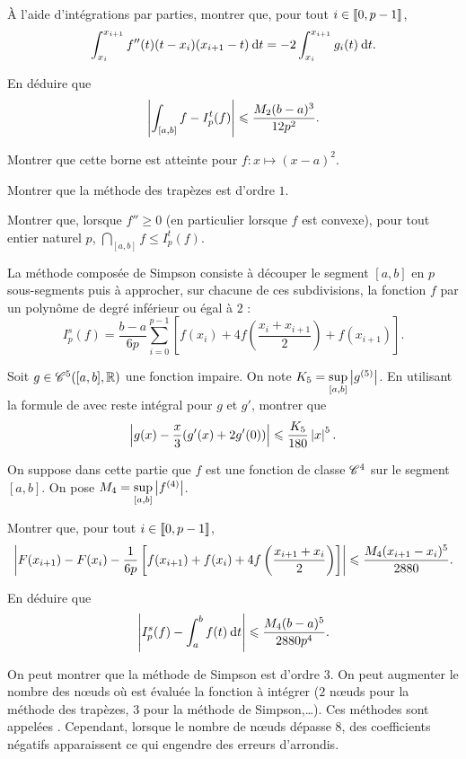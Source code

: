 \documentclass[oneside,11pt]{book}
\begin{document}
\begin{refsection}
\begin{probleme*}
\qu À l'aide d'intégrations par parties, montrer que, pour tout $i \in \llbracket0,p-1\rrbracket$,
\[
\displaystyle \int_{x_i}^{x_{i+1}} f''(t) (t - x_i) (x_{i+1} - t) \:{\text d}t = - 2 \displaystyle \int_{x_i}^{x_{i+1}} g_i(t) \:{\text d}t.
\]

\qu En déduire que
\[
\left\lvert\int_{[a,b]} f - I_p^t(f)\right\rvert \leqslant \frac{M_2 (b-a)^3}{12 p^2}.
\]

\qu Montrer que cette borne est atteinte pour $f : x \mapsto (x - a)^2$.

\qu Montrer que la méthode des trapèzes est d'ordre $1$.

\qu Montrer que, lorsque $f'' \geq 0$ (en particulier lorsque $f$ est convexe), pour tout entier naturel $p$, $\dint_{[a,b]} f \leq I_p^t(f)$.

\sautdepage


La méthode composée de Simpson consiste à découper le segment $[a, b]$ en $p$ sous-segments puis à approcher, sur chacune de ces subdivisions, la fonction $f$ par un polynôme de degré inférieur ou égal à $2$ :
\[
I_p^s(f) = \frac{b-a}{6 p} \sum_{i=0}^{p-1} \left[f(x_i)+ 4 f\left(\frac{x_i + x_{i+1}}{2}\right) + f(x_{i+1})\right].
\]

\qu Soit $g \in \mathscr{C}^5([a, b], \mathbb{R})$ une fonction impaire. On note $K_5 = \sup\limits_{[a,b]} \left\lvert g^{(5)}\right\rvert$. En utilisant la formule de \cite{Taylor} avec reste intégral pour $g$ et $g'$, montrer que
\[
\left\lvert g(x) - \frac{x}{3} (g'(x) + 2 g'(0))\right\rvert \leqslant \frac{K_5}{180} \left\lvert x\right\rvert^5.
\]

On suppose dans cette partie que $f$ est une fonction de classe $\mathscr{C}^4$ sur le segment $[a, b]$. On pose $M_4 = \sup\limits_{[a,b]} \left\lvert f^{(4)}\right\rvert$.

\qu Montrer que, pour tout $i \in \llbracket0,p-1\rrbracket$,
\[
\left\lvert F(x_{i+1}) - F(x_i) - \frac{1}{6p} \left[ f(x_{i+1}) + f(x_i) + 4 f\left(\frac{x_{i+1}+x_i}{2}\right) \right]\right\rvert
\leqslant
\frac{M_4 (x_{i+1} - x_i)^5}{2880}.
\]


\qu En déduire que
\[
\left\lvert I_p^s(f) - \displaystyle \int_a^b f(t) \:{\text d}t\right\rvert \leqslant \frac{M_4 (b-a)^5}{2880 p^4}.
\]

On peut montrer que la méthode de Simpson est d'ordre $3$. On peut augmenter le nombre des n\oe{}uds où est évaluée la fonction à intégrer ($2$ n\oe{}uds pour la méthode des trapèzes, $3$ pour la méthode de Simpson,\ldots). Ces méthodes sont appelées . Cependant, lorsque le nombre de n\oe{}uds dépasse $8$, des coefficients négatifs apparaissent ce qui engendre des erreurs d'arrondis. 
\end{probleme*}

\printbibliography[title={Mathématiciens}, heading=subbibliography]
\end{refsection}
\end{document}
